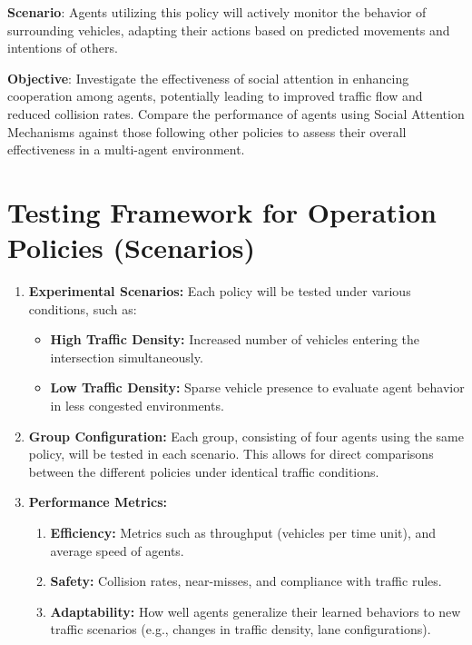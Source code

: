 \begin{enumerate}
    
    \textbf{Scenario}: Agents utilizing this policy will actively monitor the behavior of surrounding vehicles, adapting their actions based on predicted movements and intentions of others.

    \textbf{Objective}: Investigate the effectiveness of social attention in enhancing cooperation among agents, potentially leading to improved traffic flow and reduced collision rates. 
    Compare the performance of agents using Social Attention Mechanisms against those following other policies to assess their overall effectiveness in a multi-agent environment.
\end{enumerate}


\section{Testing Framework for Operation Policies (Scenarios)}

\begin{enumerate}
    \item \textbf{Experimental Scenarios:} Each policy will be tested under various conditions, such as:
    \begin{itemize}
        \item \textbf{High Traffic Density:} Increased number of vehicles entering the intersection simultaneously.
        \item \textbf{Low Traffic Density:} Sparse vehicle presence to evaluate agent behavior in less congested environments.
    \end{itemize}
    \item \textbf{Group Configuration:} Each group, consisting of four agents using the same policy, will be tested in each scenario. This allows for direct comparisons between the different policies under identical traffic conditions.
    \item \textbf{Performance Metrics:}
    \begin{enumerate}
        \item \textbf{Efficiency:} Metrics such as throughput (vehicles per time unit), and average speed of agents.
        \item \textbf{Safety:} Collision rates, near-misses, and compliance with traffic rules.
        \item \textbf{Adaptability:} How well agents generalize their learned behaviors to new traffic scenarios (e.g., changes in traffic density, lane configurations).
    \end{enumerate}
\end{enumerate}


